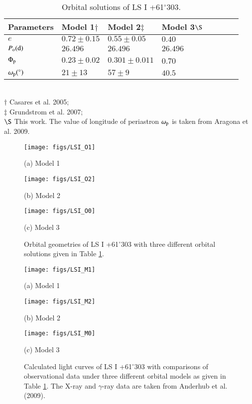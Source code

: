 \documentclass{aa}
\def\LSI61{LS I +61$^{\circ}$303}
\begin{document}
\begin{table}%
\caption{Orbital solutions of \LSI61. \label{tab:LSI}}
\begin{tabular}{l l l l l l l l}
\hline
Parameters& Model 1$\dag$  & Model 2$\ddag$ &  Model 3$\S$\\
\hline
$e$ & $0.72\pm0.15$  &$0.55\pm0.05$ & $0.40$  \\
$P_{\rm o}(\rm{d})$ & $26.496$ &$26.496$ &$26.496$  \\
$\Phi_{\rm p}$ & $0.23\pm0.02$& $0.301\pm0.011$& 0.70\\
$\omega_{\rm p}(^{\circ})$ & $21\pm13$& $57\pm9$ &$40.5$ \\
\hline
\end{tabular}
\\
{{
\footnotesize
$\dag$ Casares et al. 2005;\\
$\ddag$ Grundstrom et al. 2007;\\
$\S$ This work. The value of longitude of periastron $\omega_{\rm p}$ is taken from Aragona et al. 2009.
}}
\end{table}

\begin{figure}%
\begin{minipage}{\linewidth}
  \centerline{\texttt{[image: figs/LSI\_O1]}}
  \centerline{(a) Model 1}
\end{minipage}
\vfill
\begin{minipage}{\linewidth}
  \centerline{\texttt{[image: figs/LSI\_O2]}}
  \centerline{(b) Model 2}
\end{minipage}
\vfill
\begin{minipage}{\linewidth}
  \centerline{\texttt{[image: figs/LSI\_O0]}}
  \centerline{(c) Model 3}
\end{minipage}
\caption{Orbital geometries of \LSI61 with three different orbital solutions given in Table  \ref{tab:LSI}.}
\label{fig:LSI_O}
\end{figure}

\begin{figure}
\begin{minipage}{\linewidth}
  \centerline{\texttt{[image: figs/LSI\_M1]}}
  \centerline{(a) Model 1}
\end{minipage}
\vfill
\begin{minipage}{\linewidth}
  \centerline{\texttt{[image: figs/LSI\_M2]}}
  \centerline{(b) Model 2}
\end{minipage}
\vfill
\begin{minipage}{\linewidth}
  \centerline{\texttt{[image: figs/LSI\_M0]}}
  \centerline{(c) Model 3}
\end{minipage}
\caption{Calculated light curves of \LSI61 with comparisons of observational data under three different orbital models as given in Table \ref{tab:LSI}. The X-ray and $\gamma$-ray data are taken from Anderhub et al. (2009).}
\label{fig:LSI}
\end{figure}
\end{document}

